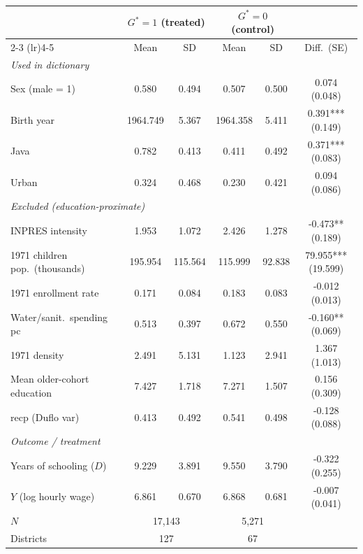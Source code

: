 \begin{tabular}{lccccc}
\toprule
 & \multicolumn{2}{c}{$G^*=1$ (treated)} & \multicolumn{2}{c}{$G^*=0$ (control)} & \\
\cmidrule(lr){2-3} \cmidrule(lr){4-5}
 & Mean & SD & Mean & SD & Diff.\ (SE) \\
\midrule
\multicolumn{6}{l}{\textit{Used in dictionary}} \\
Sex (male = 1) & 0.580 & 0.494 & 0.507 & 0.500 & 0.074 (0.048) \\
Birth year & 1964.749 & 5.367 & 1964.358 & 5.411 & 0.391*** (0.149) \\
Java & 0.782 & 0.413 & 0.411 & 0.492 & 0.371*** (0.083) \\
Urban & 0.324 & 0.468 & 0.230 & 0.421 & 0.094 (0.086) \\
\midrule \multicolumn{6}{l}{\textit{Excluded (education-proximate)}} \\
INPRES intensity & 1.953 & 1.072 & 2.426 & 1.278 & -0.473** (0.189) \\
1971 children pop.\ (thousands) & 195.954 & 115.564 & 115.999 & 92.838 & 79.955*** (19.599) \\
1971 enrollment rate & 0.171 & 0.084 & 0.183 & 0.083 & -0.012 (0.013) \\
Water/sanit.\ spending pc & 0.513 & 0.397 & 0.672 & 0.550 & -0.160** (0.069) \\
1971 density & 2.491 & 5.131 & 1.123 & 2.941 & 1.367 (1.013) \\
Mean older-cohort education & 7.427 & 1.718 & 7.271 & 1.507 & 0.156 (0.309) \\
recp (Duflo var) & 0.413 & 0.492 & 0.541 & 0.498 & -0.128 (0.088) \\
\midrule \multicolumn{6}{l}{\textit{Outcome / treatment}} \\
Years of schooling ($D$) & 9.229 & 3.891 & 9.550 & 3.790 & -0.322 (0.255) \\
$Y$ (log hourly wage) & 6.861 & 0.670 & 6.868 & 0.681 & -0.007 (0.041) \\
\midrule
$N$ & \multicolumn{2}{c}{17,143} & \multicolumn{2}{c}{5,271} & \\
Districts & \multicolumn{2}{c}{127} & \multicolumn{2}{c}{67} & \\
\bottomrule
\end{tabular}
